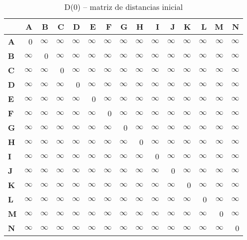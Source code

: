 \documentclass{article}
\newcommand{\INF}{$\infty$}
\begin{document}
\begin{table}[H]\centering
\caption{D(0) -- matriz de distancias inicial}
\begin{tabular}{l r r r r r r r r r r r r r r}
\toprule
 & \textbf{A} & \textbf{B} & \textbf{C} & \textbf{D} & \textbf{E} & \textbf{F} & \textbf{G} & \textbf{H} & \textbf{I} & \textbf{J} & \textbf{K} & \textbf{L} & \textbf{M} & \textbf{N}\\\midrule
\textbf{A} & 0 & \INF & \INF & \INF & \INF & \INF & \INF & \INF & \INF & \INF & \INF & \INF & \INF & \INF \\
\textbf{B} & \INF & 0 & \INF & \INF & \INF & \INF & \INF & \INF & \INF & \INF & \INF & \INF & \INF & \INF \\
\textbf{C} & \INF & \INF & 0 & \INF & \INF & \INF & \INF & \INF & \INF & \INF & \INF & \INF & \INF & \INF \\
\textbf{D} & \INF & \INF & \INF & 0 & \INF & \INF & \INF & \INF & \INF & \INF & \INF & \INF & \INF & \INF \\
\textbf{E} & \INF & \INF & \INF & \INF & 0 & \INF & \INF & \INF & \INF & \INF & \INF & \INF & \INF & \INF \\
\textbf{F} & \INF & \INF & \INF & \INF & \INF & 0 & \INF & \INF & \INF & \INF & \INF & \INF & \INF & \INF \\
\textbf{G} & \INF & \INF & \INF & \INF & \INF & \INF & 0 & \INF & \INF & \INF & \INF & \INF & \INF & \INF \\
\textbf{H} & \INF & \INF & \INF & \INF & \INF & \INF & \INF & 0 & \INF & \INF & \INF & \INF & \INF & \INF \\
\textbf{I} & \INF & \INF & \INF & \INF & \INF & \INF & \INF & \INF & 0 & \INF & \INF & \INF & \INF & \INF \\
\textbf{J} & \INF & \INF & \INF & \INF & \INF & \INF & \INF & \INF & \INF & 0 & \INF & \INF & \INF & \INF \\
\textbf{K} & \INF & \INF & \INF & \INF & \INF & \INF & \INF & \INF & \INF & \INF & 0 & \INF & \INF & \INF \\
\textbf{L} & \INF & \INF & \INF & \INF & \INF & \INF & \INF & \INF & \INF & \INF & \INF & 0 & \INF & \INF \\
\textbf{M} & \INF & \INF & \INF & \INF & \INF & \INF & \INF & \INF & \INF & \INF & \INF & \INF & 0 & \INF \\
\textbf{N} & \INF & \INF & \INF & \INF & \INF & \INF & \INF & \INF & \INF & \INF & \INF & \INF & \INF & 0 \\
\bottomrule
\end{tabular}
\end{table}
\end{document}
